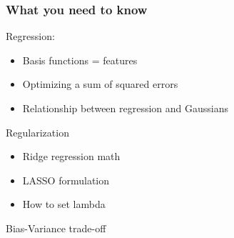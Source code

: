 \subsubsection{What you need to know}
Regression:
\begin{itemize}
	\item Basis functions = features
	\item Optimizing a sum of squared errors
	\item Relationship between regression and Gaussians
\end{itemize}
Regularization
\begin{itemize}
	\item Ridge regression math
	\item LASSO formulation
	\item How to set lambda
\end{itemize}
Bias-Variance trade-off





